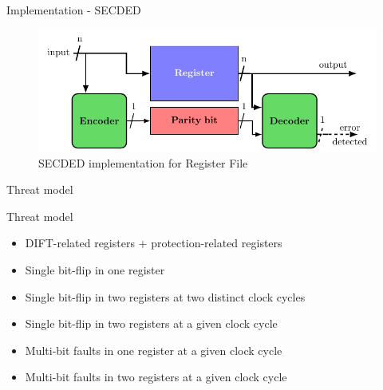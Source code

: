 \begin{frame}{Implementation - SECDED}
    \begin{figure}
        \centering
        \includegraphics[width=.9\textwidth, page=5]{src/4_strategies/img/archi_contremesures.pdf}
        \caption{SECDED implementation for Register File}
        \label{fig:secded_implem_rf}
    \end{figure}
\end{frame}
\begin{frame}{Threat model}
    \begin{block}{Threat model}
        \begin{itemize}
            \item DIFT-related registers + protection-related registers
            \item Single bit-flip in one register
            \item Single bit-flip in two registers at two distinct clock cycles
            \item Single bit-flip in two registers at a given clock cycle
            \item Multi-bit faults in one register at a given clock cycle
            \item Multi-bit faults in two registers at a given clock cycle
        \end{itemize}
    \end{block}
\end{frame}
